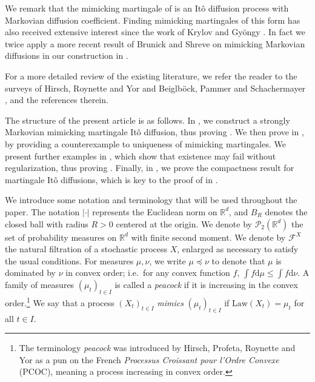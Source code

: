 \documentclass[12pt,oneside]{amsart}
\theoremstyle{definition}
\newcommand{\F}{\mathcal F}
\newcommand{\Law}{\mathrm{Law}}
\newcommand{\D}{\mathrm{d}}
\newcommand{\R}{\mathbb R}
\newcommand{\Pc}{\mathcal P}
\def\R{{\mathbb R}}
\numberwithin{equation}{section}
\begin{document}
We remark that the mimicking martingale of  is an It\^o diffusion process with Markovian diffusion coefficient. Finding mimicking martingales of this form has also received extensive interest since the work of Krylov \cite{Kr85} and Gy\"ongy \cite{Gy86}. In fact we twice apply a more recent result of Brunick and Shreve \cite{BrSh13} on mimicking Markovian diffusions in our construction in .

For a more detailed review of the existing literature, we refer the reader to the surveys of Hirsch, Roynette and Yor \cite{HiRoYo14} and Beiglb\"ock, Pammer and Schachermayer \cite{BePaSc22}, and the references therein.

The structure of the present article is as follows. In , we construct a strongly Markovian mimicking martingale It\^o diffusion, thus proving . We then prove  in , by providing a counterexample to uniqueness of mimicking martingales. We present further examples in , which show that existence may fail without regularization, thus proving . Finally, in , we prove the compactness result  for martingale It\^o diffusions, which is key to the proof of  in .

We introduce some notation and terminology that will be used throughout the paper. The notation $|\cdot|$ represents the Euclidean norm on $\R^d$, and $B_R$ denotes the closed ball with radius $R > 0$ centered at the origin. We denote by $\Pc_2(\R^d)$ the set of probability measures on $\R^d$ with finite second moment. We denote by $\F^X$ the natural filtration of a stochastic process $X$, enlarged as necessary to satisfy the usual conditions. For measures $\mu, \nu$, we write $\mu \preceq \nu$ to denote that $\mu$ is dominated by $\nu$ in convex order; i.e.~for any convex function $f$, $\int f \D \mu \leq \int f \D \nu$. A family of measures $(\mu_t)_{t \in I}$ is called a \emph{peacock} if it is increasing in the convex order.\footnote{The terminology \emph{peacock} was introduced by Hirsch, Profeta, Roynette and Yor \cite{HiPrRoYo11} as a pun on the French \emph{Processus Croissant pour l'Ordre Convexe} (PCOC), meaning a process increasing in convex order.} We say that a process $(X_t)_{t \in I}$ \emph{mimics} $(\mu_t)_{t \in I}$ if $\Law(X_t) = \mu_t$ for all $t \in I$.
\end{document}

